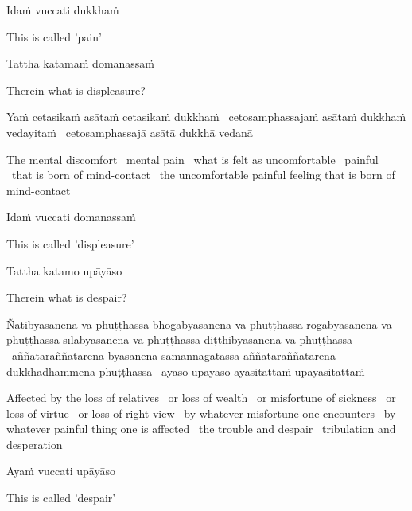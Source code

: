 Idaṁ vuccati dukkhaṁ

\begin{cprenglish}
  This is called 'pain'
\end{cprenglish}

Tattha katamaṁ domanassaṁ

\begin{cprenglish}
  Therein what is displeasure?
\end{cprenglish}

Yaṁ cetasikaṁ asātaṁ cetasikaṁ dukkhaṁ \breathmark\ cetosamphassajaṁ asātaṁ dukkhaṁ vedayitaṁ \breathmark\ cetosamphassajā asātā dukkhā vedanā

\begin{cprenglish}
  The mental discomfort \breathmark\ mental pain \breathmark\ what is felt as uncomfortable \breathmark\ painful \breathmark\ that is born of mind-contact \breathmark\ the uncomfortable painful feeling that is born of mind-contact
\end{cprenglish}

Idaṁ vuccati domanassaṁ

\begin{cprenglish}
  This is called 'displeasure'
\end{cprenglish}

Tattha katamo upāyāso

\begin{cprenglish}
  Therein what is despair?
\end{cprenglish}

Ñātibyasanena vā phuṭṭhassa bhogabyasanena vā phuṭṭhassa rogabyasanena vā phuṭṭhassa sīlabyasanena vā phuṭṭhassa diṭṭhibyasanena vā phuṭṭhassa \breathmark\ aññataraññatarena byasanena samannāgatassa aññataraññatarena dukkhadhammena phuṭṭhassa \breathmark\ āyāso upāyāso āyāsitattaṁ upāyāsitattaṁ

\begin{cprenglish}
  Affected by the loss of relatives \breathmark\ or loss of wealth \breathmark\ or misfortune of sickness \breathmark\ or loss of virtue \breathmark\ or loss of right view \breathmark\ by whatever misfortune one encounters \breathmark\ by whatever painful thing one is affected \breathmark\ the trouble and despair \breathmark\ tribulation and desperation
\end{cprenglish}

Ayaṁ vuccati upāyāso

\begin{cprenglish}
  This is called 'despair'
\end{cprenglish}

